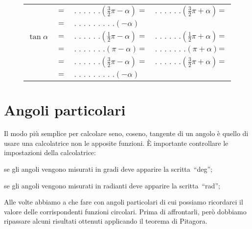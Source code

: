 \begin{figure}[!h]
\begin{minipage}{.7\textwidth}
\begin{center}
\begin{tabular}{rclclc}
              & $=$ & $\text{. . . . . .}
                       \left(\frac{3}{2}\pi-\alpha \right)$  
              & $=$ & $\text{. . . . . .}
                       \left(\frac{3}{2}\pi+\alpha \right)$ & $=$ \\
              & $=$ & $\text{. . . . . . . . .}
                       \left(-\alpha \right)$ \\
$\tan \alpha$ & $=$ & $\text{. . . . . .}
                       \left(\frac{1}{2}\pi-\alpha \right)$ 
              & $=$ & $\text{. . . . . .}
                       \left(\frac{1}{2}\pi+\alpha \right)$ & $=$\\
              & $=$ & $\text{. . . . . . .}
                       \left(\pi-\alpha \right)$  
              & $=$ & $\text{. . . . . . .}
                       \left(\pi+\alpha \right)$ & $=$ \\
              & $=$ & $\text{. . . . . .}
                       \left(\frac{3}{2}\pi-\alpha \right)$  
              & $=$ & $\text{. . . . . .}
                       \left(\frac{3}{2}\pi+\alpha \right)$ & $=$ \\
              & $=$ & $\text{. . . . . . . . .}
                       \left(-\alpha \right)$ 
\end{tabular}
\end{center}
\end{minipage}
\vspace{-18pt}
\end{figure} 

\section{Angoli particolari}
\label{sec:gonio_angoli_particolari}

Il modo più semplice per calcolare seno, coseno, tangente di un angolo è quello 
di usare una calcolatrice non le apposite funzioni. 
È importante controllare le impostazioni della calcolatrice:
\begin{itemize*}
 \item se gli angoli vengono misurati in gradi deve apparire la 
 scritta~``deg'';
 \item se gli angoli vengono misurati in radianti deve apparire la 
 scritta~``rad'';
\end{itemize*}

Alle volte abbiamo a che fare con angoli particolari di cui possiamo ricordarci 
il valore delle corrispondenti funzioni circolari. 
Prima di affrontarli, però dobbiamo ripassare alcuni risultati ottenuti 
applicando il teorema di Pitagora.


